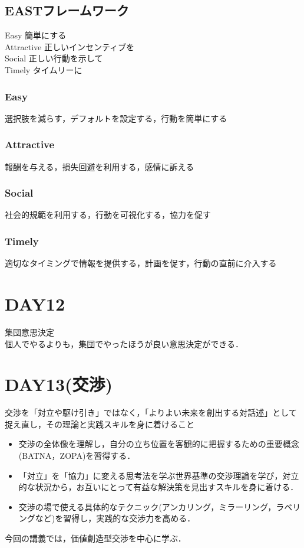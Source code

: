 \documentclass[a4paper,11pt]{ltjsarticle}
\begin{document}
\subsection{EASTフレームワーク}
Easy 簡単にする\\
Attractive 正しいインセンティブを\\
Social 正しい行動を示して\\
Timely タイムリーに
\subsubsection{Easy}
選択肢を減らす，デフォルトを設定する，行動を簡単にする
\subsubsection{Attractive}
報酬を与える，損失回避を利用する，感情に訴える
\subsubsection{Social}
社会的規範を利用する，行動を可視化する，協力を促す
\subsubsection{Timely}
適切なタイミングで情報を提供する，計画を促す，行動の直前に介入する
\section{DAY12}
集団意思決定\\
個人でやるよりも，集団でやったほうが良い意思決定ができる．
\section{DAY13(交渉)}
交渉を「対立や駆け引き」ではなく，「よりよい未来を創出する対話述」として捉え直し，その理論と実践スキルを身に着けること
\begin{itemize}
  \item 交渉の全体像を理解し，自分の立ち位置を客観的に把握するための重要概念(BATNA，ZOPA)を習得する．
  \item 「対立」を「協力」に変える思考法を学ぶ世界基準の交渉理論を学び，対立的な状況から，お互いにとって有益な解決策を見出すスキルを身に着ける．
  \item 交渉の場で使える具体的なテクニック(アンカリング，ミラーリング，ラベリングなど)を習得し，実践的な交渉力を高める．
\end{itemize}
今回の講義では，価値創造型交渉を中心に学ぶ．
\end{document}
